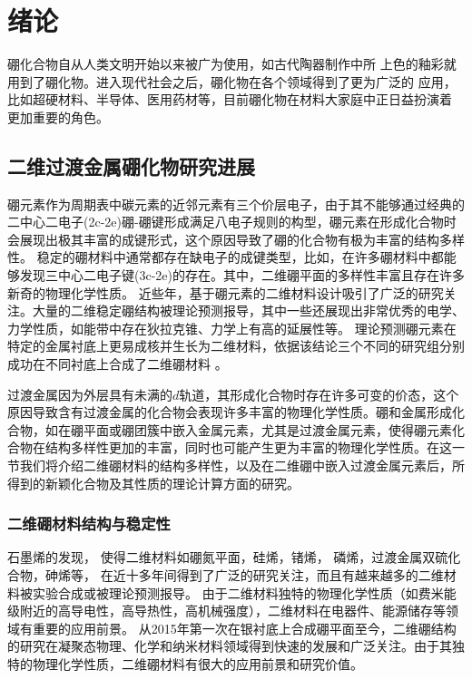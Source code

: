 \chapter{绪论}\label{chapter_introduction}
硼化合物自从人类文明开始以来被广为使用，如古代陶器制作中所
上色的釉彩就用到了硼化物。进入现代社会之后，硼化物在各个领域得到了更为广泛的
应用，比如超硬材料、半导体、医用药材等，目前硼化物在材料大家庭中正日益扮演着
更加重要的角色\cite{albert2009boron}。

\section{二维过渡金属硼化物研究进展}

硼元素作为周期表中碳元素的近邻元素有三个价层电子，由于其不能够通过经典的二中心二电子(2c-2e)硼-硼键形成满足八电子规则的构型，硼元素在形成化合物时会展现出极其丰富的成键形式，这个原因导致了硼的化合物有极为丰富的结构多样性。
稳定的硼材料中通常都存在缺电子的成键类型，比如，在许多硼材料中都能够发现三中心二电子键(3c-2e)的存在。其中，二维硼平面的多样性丰富且存在许多新奇的物理化学性质。
近些年，基于硼元素的二维材料设计吸引了广泛的研究关注。大量的二维稳定硼结构被理论预测报导，其中一些还展现出非常优秀的电学、力学性质，如能带中存在狄拉克锥、力学上有高的延展性等。
理论预测硼元素在特定的金属衬底上更易成核并生长为二维材料\cite{liu2013probing,liu2013boron,zhang2015two}，依据该结论三个不同的研究组分别成功在不同衬底上合成了二维硼材料\cite{mannix2015synthesis,zhong2017metastable,zhong2017synthesis,li2018experimental,feng2016experimental} 。

过渡金属因为外层具有未满的$d$轨道，其形成化合物时存在许多可变的价态，这个原因导致含有过渡金属的化合物会表现许多丰富的物理化学性质。硼和金属形成化合物，如在硼平面或硼团簇中嵌入金属元素，尤其是过渡金属元素，使得硼元素化合物在结构多样性更加的丰富，同时也可能产生更为丰富的物理化学性质。在这一节我们将介绍二维硼材料的结构多样性，以及在二维硼中嵌入过渡金属元素后，所得到的新颖化合物及其性质的理论计算方面的研究。

\subsection{二维硼材料结构与稳定性}
石墨烯\cite{novoselov2005two, zhang2005experimental, ferrari2006raman,yan2012first, lu2009tuning}的发现，
使得二维材料如硼氮平面\cite{watanabe2004direct}，硅烯\cite{liu2014comparison, molle2018silicene, li2018stable}，锗烯\cite{liu2015multiple}，
磷烯\cite{hu2018strong}，过渡金属双硫化合物\cite{cai2014constructing, wang2012electronics, pei2015exciton}，砷烯\cite{zhang2015atomically}等，
在近十多年间得到了广泛的研究关注，而且有越来越多的二维材料被实验合成或被理论预测报导。
由于二维材料独特的物理化学性质（如费米能级附近的高导电性，高导热性，高机械强度），二维材料在电器件、能源储存等领域有重要的应用前景。
从2015年第一次在银衬底上合成硼平面至今，二维硼结构的研究在凝聚态物理、化学和纳米材料领域得到快速的发展和广泛关注。由于其独特的物理化学性质，二维硼材料有很大的应用前景和研究价值。

